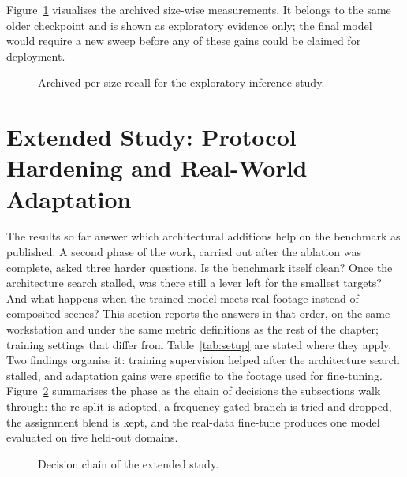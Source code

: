 Figure~\ref{fig:sahibars} visualises the archived size-wise measurements. It
belongs to the same older checkpoint and is shown as exploratory evidence only;
the final model would require a new sweep before any of these gains could be
claimed for deployment.

\begin{figure}[tbp]
  \centering
  \caption{Archived per-size recall for the exploratory inference study.}
  \label{fig:sahibars}
\end{figure}

\section{Extended Study: Protocol Hardening and Real-World Adaptation}
\label{sec:partb}
The results so far answer which architectural additions help on the benchmark
as published. A second phase of the work, carried out after the ablation was
complete, asked three harder questions. Is the benchmark itself clean? Once the
architecture search stalled, was there still a lever left for the smallest
targets? And what happens when the trained model meets real footage instead of
composited scenes? This section reports the answers in that order, on the same
workstation and under the same metric definitions as the rest of the chapter;
training settings that differ from Table~\ref{tab:setup} are stated where they
apply. Two findings organise it: training supervision helped after the
architecture search stalled, and adaptation gains were specific to the footage
used for fine-tuning. Figure~\ref{fig:partbchain} summarises the phase as the chain
of decisions the subsections walk through: the re-split is adopted, a
frequency-gated branch is tried and dropped, the assignment blend is kept,
and the real-data fine-tune produces one model evaluated on five held-out
domains.

\begin{figure}[tbp]
  \centering
  \caption{Decision chain of the extended study.}
  \label{fig:partbchain}
\end{figure}

